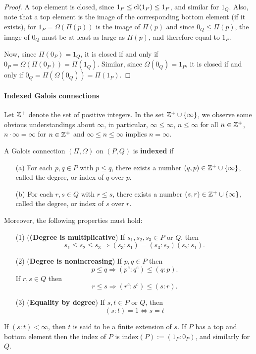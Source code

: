 \begin{proof}
A top element is closed, since $1_P\leq\mathrm{cl}(1_P)\leq 1_P$, and similar for $1_Q$. Also, note that a top element is the image of the corresponding bottom element (if it exists), for $1_P=\Omega(\Pi(p))$ is the image of $\Pi(p)$ and since $0_Q\leq\Pi(p)$, the image of $0_Q$ must be at least as large as $\Pi(p)$, and therefore equal to $1_P$.\par
Now, since $\Pi(0_P)=1_Q$, it is closed if and only if $0_P=\Omega(\Pi(0_P))=\Pi(1_Q)$. Similar, since $\Omega(0_Q)=1_P$, it is closed if and only if $0_Q=\Pi(\Omega(0_Q))=\Pi(1_P)$.
\end{proof}
\paragraph{Indexed Galois connections}
Let $\mathbb{Z}^+$ denote the set of positive integers. In the set $\mathbb{Z}^+\cup\{\infty\}$, we observe some obvious understandings about $\infty$, in particular, $\infty\leq\infty$, $n\leq\infty$ for all $n\in\mathbb{Z}^+$, $n\cdot\infty=\infty$ for $n\in\mathbb{Z}^+$ and $\infty\leq n\leq\infty$ implies $n=\infty$.
\begin{definition}
A Galois connection $(\Pi,\Omega)$ on $(P,Q)$ is \textbf{indexed} if
\begin{itemize}
\item[(a)] For each $p,q\in P$ with $p\leq q$, there exists a number $(q,p)\in\mathbb{Z}^+\cup\{\infty\}$, called the degree, or index of $q$ over $p$.
\item[(b)] For each $r,s\in Q$ with $r\leq s$, there exists a number $(s,r)\in\mathbb{Z}^+\cup\{\infty\}$, called the degree, or index of $s$ over $r$.
\end{itemize}
Moreover, the following properties must hold:
\begin{itemize}
\item[(1)] (\textbf{(Degree is multiplicative}) If $s_1,s_2,s_3\in P$ or $Q$, then
\[s_1\leq s_2\leq s_3\Rightarrow (s_3:s_1)=(s_3:s_2)(s_2:s_1).\]
\item[(2)] (\textbf{Degree is nonincreasing}) If $p,q\in P$ then
\[p\leq q\Rightarrow (p^e:q^e)\leq(q:p).\]
If $r,s\in Q$ then
\[r\leq s\Rightarrow (r^c:s^c)\leq(s:r).\]
\item[(3)] (\textbf{Equality by degree}) If $s,t\in P$ or $Q$, then
\[(s:t)=1\Leftrightarrow s=t\]
\end{itemize}
If $(s:t)<\infty$, then $t$ is said to be a finite extension of $s$. If $P$ has a top and bottom element then the index of $P$ is $\mathrm{index}(P):=(1_P:0_P)$, and similarly for $Q$. 
\end{definition}

